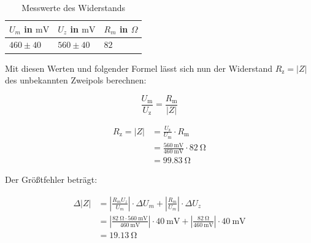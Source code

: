             \begin{table}[H]
                \centering
                \caption{Messwerte des Widerstands}
                \vspace{1em}
                \begin{tabular}{|l|l|l|}
                    \hline
                    $U_m$ in $\mathrm{mV}$ & $U_z$ in $\mathrm{mV}$ & $R_{m}$ in $\Omega$\\
                    \hline
                    \hline
                    $460 \pm 40$ & $560 \pm 40$ & $82$\\
                    \hline
                \end{tabular}
                \label{tab:Versuch2_Widerstand}
            \end{table}

            Mit diesen Werten und folgender Formel lässt sich nun der Widerstand $R_{\mathrm{z}} = |Z|$ des unbekannten Zweipols berechnen:

            \begin{equation}
                \frac{U_{\mathrm{m}}}{U_{\mathrm{z}}} = \frac{R_{\mathrm{m}}}{|Z|}
                \label{eq:Versuch2_Widerstand_Formel}
            \end{equation}
            
            \begin{equation}
                \begin{aligned}
                    R_{\mathrm{z}} = |Z| &= \frac{U_{\mathrm{z}}}{U_{\mathrm{m}}} \cdot R_{\mathrm{m}}\\
                                   &= \frac{560\ \mathrm{mV}}{460\ \mathrm{mV}} \cdot 82\ \mathrm{\Omega}\\
                                   &= 99.83\ \mathrm{\Omega}
                \end{aligned}
                \label{eq:Versuch2_Widerstand}
            \end{equation}

            Der Größtfehler beträgt:

            \begin{equation}
                \begin{aligned}
                    \Delta |Z| &= \left|\frac{R_{m} U_{z}}{U_{m}} \right| \cdot \Delta U_{m} + \left|\frac{R_{m}}{U_{m}} \right| \cdot \Delta U_{z}\\
                               &= \left|\frac{82\ \mathrm{\Omega} \cdot 560\ \mathrm{mV}}{460\ \mathrm{mV}} \right| \cdot 40\ \mathrm{mV} + \left|\frac{82\ \mathrm{\Omega}}{460\ \mathrm{mV}} \right| \cdot 40\ \mathrm{mV}\\
                               &= 19.13\ \mathrm{\Omega}
                \end{aligned}
                \label{eq:Versuch2_Widerstand_Fehler}
            \end{equation}

